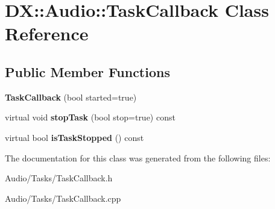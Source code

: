 \hypertarget{class_d_x_1_1_audio_1_1_task_callback}{\section{D\-X\-:\-:Audio\-:\-:Task\-Callback Class Reference}
\label{class_d_x_1_1_audio_1_1_task_callback}
}
\subsection*{Public Member Functions}
\begin{DoxyCompactItemize}
\item 
\hypertarget{class_d_x_1_1_audio_1_1_task_callback_ad82cf0da301c316fda1d51708b7f5e47}{{\bfseries Task\-Callback} (bool started=true)}\label{class_d_x_1_1_audio_1_1_task_callback_ad82cf0da301c316fda1d51708b7f5e47}

\item 
\hypertarget{class_d_x_1_1_audio_1_1_task_callback_a961d384f527c061f12728d2751253f18}{virtual void {\bfseries stop\-Task} (bool stop=true) const }\label{class_d_x_1_1_audio_1_1_task_callback_a961d384f527c061f12728d2751253f18}

\item 
\hypertarget{class_d_x_1_1_audio_1_1_task_callback_a66625a21bc4c3e7e9ca630979c889c44}{virtual bool {\bfseries is\-Task\-Stopped} () const }\label{class_d_x_1_1_audio_1_1_task_callback_a66625a21bc4c3e7e9ca630979c889c44}

\end{DoxyCompactItemize}


The documentation for this class was generated from the following files\-:\begin{DoxyCompactItemize}
\item 
Audio/\-Tasks/Task\-Callback.\-h\item 
Audio/\-Tasks/Task\-Callback.\-cpp\end{DoxyCompactItemize}
